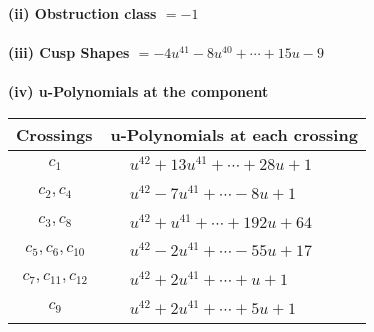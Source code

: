 \documentclass[1p]{elsarticle_modified}
\theoremstyle{definition}
\begin{document}
\flushleft \textbf{(ii) Obstruction class $= -1$}\\~\\
\flushleft \textbf{(iii) Cusp Shapes $= -4 u^{41}-8 u^{40}+\cdots+15 u-9$}\\~\\
\newpage\renewcommand{\arraystretch}{1}
\flushleft \textbf{(iv) u-Polynomials at the component}\newline \\
\begin{tabular}{m{50pt}|m{274pt}}
Crossings & \hspace{64pt}u-Polynomials at each crossing \\
\hline $$\begin{aligned}c_{1}\end{aligned}$$&$\begin{aligned}
&u^{42}+13 u^{41}+\cdots+28 u+1
\end{aligned}$\\
\hline $$\begin{aligned}c_{2},c_{4}\end{aligned}$$&$\begin{aligned}
&u^{42}-7 u^{41}+\cdots-8 u+1
\end{aligned}$\\
\hline $$\begin{aligned}c_{3},c_{8}\end{aligned}$$&$\begin{aligned}
&u^{42}+u^{41}+\cdots+192 u+64
\end{aligned}$\\
\hline $$\begin{aligned}c_{5},c_{6},c_{10}\end{aligned}$$&$\begin{aligned}
&u^{42}-2 u^{41}+\cdots-55 u+17
\end{aligned}$\\
\hline $$\begin{aligned}c_{7},c_{11},c_{12}\end{aligned}$$&$\begin{aligned}
&u^{42}+2 u^{41}+\cdots+u+1
\end{aligned}$\\
\hline $$\begin{aligned}c_{9}\end{aligned}$$&$\begin{aligned}
&u^{42}+2 u^{41}+\cdots+5 u+1
\end{aligned}$\\
\hline
\end{tabular}\\~\\
\end{document}
